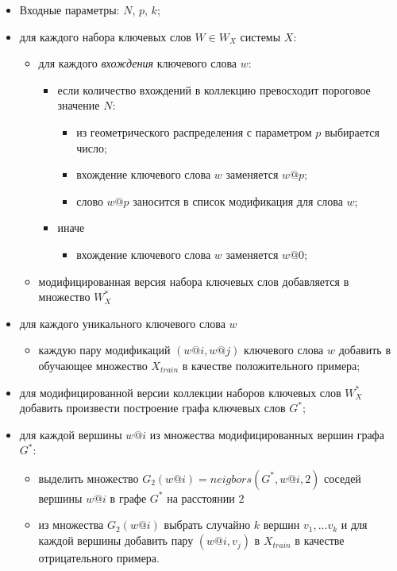 \begin{itemize}
    \item Входные параметры: $N$, $p$, $k$;
    \item для каждого набора ключевых слов $W \in W_X$ системы $X$:
        \begin{itemize}
            \item для каждого \textit{вхождения} ключевого слова $w$:
                \begin{itemize}
                    \item если количество вхождений в коллекцию превосходит пороговое значение $N$:
                        \begin{itemize}
                            \item из геометрического распределения с параметром $p$ выбирается число;
                            \item вхождение ключевого слова $w$ заменяется $w@p$;
                            \item слово $w@p$ заносится в список модификация для слова $w$;
                        \end{itemize}
                    \item иначе
                        \begin{itemize}
                            \item вхождение ключевого слова $w$ заменяется $w@0$;
                        \end{itemize}
                \end{itemize}
            \item модифицированная версия набора ключевых слов добавляется в множество $W^{*}_X$
        \end{itemize}
    \item для каждого уникального ключевого слова $w$
        \begin{itemize}
            \item каждую пару модификаций $(w@i, w@j)$ ключевого слова $w$ добавить в обучающее множество $X_{train}$ в качестве положительного примера;
        \end{itemize}
    \item для модифицированной версии коллекции наборов ключевых слов $W^{*}_X$ добавить произвести построение графа ключевых слов $G^{*}$;
    \item для каждой вершины $w@i$ из множества модифицированных вершин графа $G^{*}$:
        \begin{itemize}
            \item выделить множество  $G_{2}(w@i) = neigbors(G^{*}, w@i, 2)$ соседей вершины $w@i$ в графе $G^{*}$ на расстоянии $2$
            \item из множества $G_{2}(w@i)$ выбрать случайно $k$ вершин $v_1, ... v_k$ и для каждой вершины добавить пару $(w@i, v_j)$ в $X_{train}$ в качестве отрицательного примера.
        \end{itemize}
\end{itemize}

